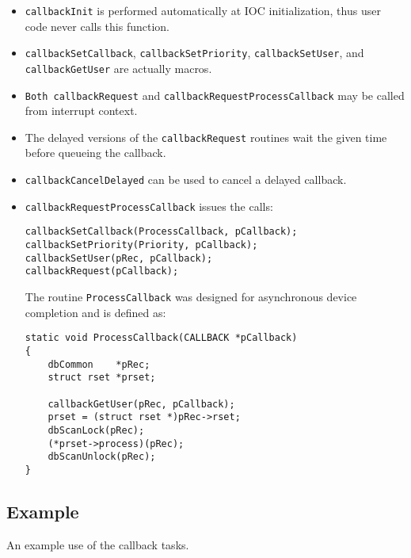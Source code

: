 \begin{itemize}\item \verb|callbackInit| is performed automatically at IOC initialization, thus user code never calls this function.

\item \verb|callbackSetCallback|, \verb|callbackSetPriority|, \verb|callbackSetUser|, and \verb|callbackGetUser| are 
actually macros.

\item \verb|Both callbackRequest| and \verb|callbackRequestProcessCallback| may be called from interrupt context.

\item The delayed versions of the \verb|callbackRequest| routines wait the given time before queueing the callback.

\item \verb|callbackCancelDelayed| can be used to cancel a delayed callback.

\item \verb|callbackRequestProcessCallback| issues the calls:

\begin{verbatim}
callbackSetCallback(ProcessCallback, pCallback);
callbackSetPriority(Priority, pCallback);
callbackSetUser(pRec, pCallback);
callbackRequest(pCallback);
\end{verbatim}

The routine \verb|ProcessCallback| was designed for asynchronous device completion and is defined as:

\begin{verbatim}
static void ProcessCallback(CALLBACK *pCallback)
{
    dbCommon    *pRec;
    struct rset *prset;
 
    callbackGetUser(pRec, pCallback);
    prset = (struct rset *)pRec->rset;
    dbScanLock(pRec);
    (*prset->process)(pRec);
    dbScanUnlock(pRec);
}
\end{verbatim}

\end{itemize}

\subsection{Example}

An example use of the callback tasks.

